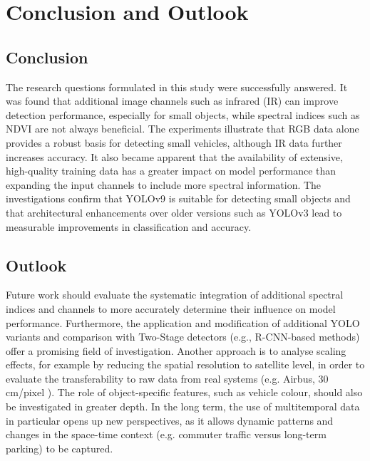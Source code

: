 \chapter{Conclusion and Outlook}
\label{ch:conclusion}

\section{Conclusion}
The research questions formulated in this study were successfully answered.
It was found that additional image channels such as infrared (IR) can improve detection performance, especially for small objects, while spectral indices such as NDVI are not always beneficial. 
The experiments illustrate that RGB data alone provides a robust basis for detecting small vehicles, although IR data further increases accuracy.
It also became apparent that the availability of extensive, high-quality training data has a greater impact on model performance than expanding the input channels to include more spectral information. 
The investigations confirm that \acrshort{YOLO}v9 is suitable for detecting small objects and that architectural enhancements over older versions such as \acrshort{YOLO}v3 lead to measurable improvements in classification and accuracy.


\section{Outlook}
Future work should evaluate the systematic integration of additional spectral indices and channels to more accurately determine their influence on model performance.
Furthermore, the application and modification of additional \acrshort{YOLO} variants and comparison with Two-Stage detectors (e.g., \acrshort{R-CNN}-based methods) offer a promising field of investigation. 
Another approach is to analyse scaling effects, for example by reducing the spatial resolution to satellite level, in order to evaluate the transferability to raw data from real systems (e.g. Airbus, 30 cm/pixel \cite{airbus_neo}). 
The role of object-specific features, such as vehicle colour, should also be investigated in greater depth.
In the long term, the use of multitemporal data in particular opens up new perspectives, as it allows dynamic patterns and changes in the space-time context (e.g. commuter traffic versus long-term parking) to be captured.
